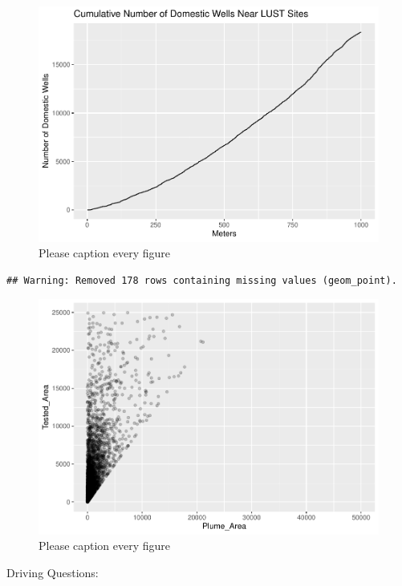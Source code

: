 \documentclass[draft,linenumbers]{agujournal2018}
\begin{document}
\begin{figure}[h]
\includegraphics{CA_Benzene_Plumes_files/figure-latex/unnamed-chunk-2-1} \caption{Please caption every figure}\label{fig:unnamed-chunk-2}
\end{figure}

\begin{verbatim}
## Warning: Removed 178 rows containing missing values (geom_point).
\end{verbatim}

\begin{figure}[h]
\includegraphics{CA_Benzene_Plumes_files/figure-latex/unnamed-chunk-3-1} \caption{Please caption every figure}\label{fig:unnamed-chunk-3}
\end{figure}

Driving Questions:
\end{document}
